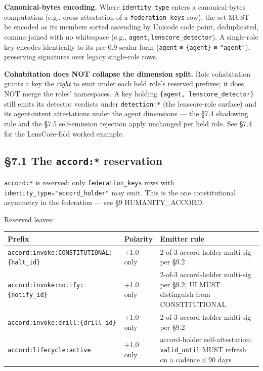 \documentclass[11pt]{article}
\begin{document}
\textbf{Canonical-bytes encoding.} Where \texttt{identity\_type} enters a canonical-bytes computation (e.g., cross-attestation of a \texttt{federation\_keys} row), the set MUST be encoded as its members sorted ascending by Unicode code point, deduplicated, comma-joined with no whitespace (e.g., \texttt{agent,lenscore\_detector}). A single-role key encodes identically to its pre-0.9 scalar form (\texttt{agent} ≡ \texttt{\{agent\}} ≡ \texttt{"agent"}), preserving signatures over legacy single-role rows.


\textbf{Cohabitation does NOT collapse the dimension split.} Role cohabitation grants a key the \textit{right} to emit under each held role's reserved prefixes; it does NOT merge the roles' namespaces. A key holding \texttt{\{agent, lenscore\_detector\}} still emits its detector verdicts under \texttt{detection:*} (the lenscore-role surface) and its agent-intent attestations under the agent dimensions — the §7.4 shadowing rule and the §7.5 self-emission rejection apply unchanged per held role. See §7.4 for the LensCore-fold worked example.


\subsection*{§7.1 The \texttt{accord:*} reservation}


\texttt{accord:*} is reserved: only \texttt{federation\_keys} rows with \texttt{identity\_type="accord\_holder"} may emit. This is the one constitutional asymmetry in the federation — see §9 HUMANITY\_ACCORD.


Reserved leaves:


{\footnotesize
\begin{longtable}{|p{5.33cm}|p{5.33cm}|p{5.33cm}|}\hline
\textbf{Prefix} & \textbf{Polarity} & \textbf{Emitter rule} \\ \hline\endhead
\texttt{accord:invoke:CONSTITUTIONAL:\{halt\_id\}} & +1.0 only & 2-of-3 accord-holder multi-sig per §9.2 \\ \hline
\texttt{accord:invoke:notify:\{notify\_id\}} & +1.0 only & 2-of-3 accord-holder multi-sig per §9.2; UI MUST distinguish from CONSTITUTIONAL \\ \hline
\texttt{accord:invoke:drill:\{drill\_id\}} & +1.0 only & 2-of-3 accord-holder multi-sig per §9.2 \\ \hline
\texttt{accord:lifecycle:active} & +1.0 only & accord-holder self-attestation; \texttt{valid\_until} MUST refresh on a cadence ≤ 90 days \\ \hline
\end{longtable}}
\end{document}
